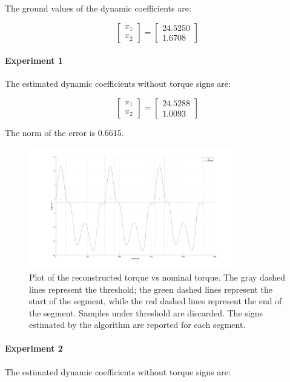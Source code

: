 \documentclass{article}
\begin{document}
The ground values of the dynamic coefficients are:

\[\begin{bmatrix}
\pi_1 \\ \pi_2
\end{bmatrix}=\begin{bmatrix}
24.5250 \\ 1.6708
\end{bmatrix}\]

\paragraph{Experiment 1} The estimated dynamic coefficients without torque signs are:

\[\begin{bmatrix}
\pi_1  \\ \pi_2 
\end{bmatrix}=\begin{bmatrix}
24.5288 \\ 1.0093
\end{bmatrix}\]

The norm of the error is 0.6615.

\begin{figure}[!htbp]
\centering
\includegraphics[width=0.8\textwidth]{images/1-dof/results_new_experiment3.png}
\caption{Plot of the reconstructed torque vs nominal torque. The gray dashed lines represent the threshold; the green dashed lines represent the start of the segment, while the red dashed lines represent the end of the segment. Samples under threshold are discarded. The signs estimated by the algorithm are reported for each segment.}
\end{figure}
\FloatBarrier

\paragraph{Experiment 2} The estimated dynamic coefficients without torque signs are:
\end{document}
